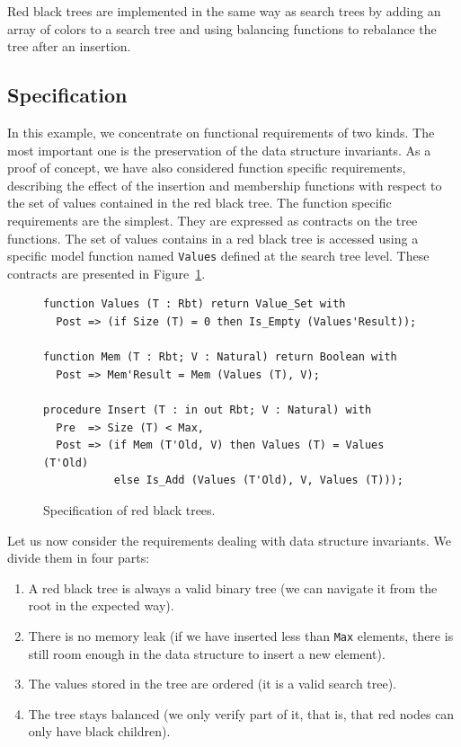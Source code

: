 \documentclass[11pt,a4paper]{article}
\begin{document}
Red black trees are implemented in the same way as search trees by adding an array of
colors to a search tree and using balancing functions to rebalance the tree after an insertion.

\subsection{Specification}

In this example, we concentrate on functional requirements of two kinds. The most important one is the
preservation of the data structure invariants. As a proof of concept, we have also considered
function specific requirements, describing the effect of the insertion and membership functions with
respect to the set of values contained in the red black tree. The function specific requirements are the
simplest. They are expressed as contracts on the tree functions. The set of values contains in a red black
tree is accessed using a specific model function named \texttt{Values} defined at the search tree level.
These contracts are presented in Figure~\ref{fig-rbt-spec}.

\begin{figure}[ht]
\begin{small}
\begin{lstlisting}
function Values (T : Rbt) return Value_Set with
  Post => (if Size (T) = 0 then Is_Empty (Values'Result));

function Mem (T : Rbt; V : Natural) return Boolean with
  Post => Mem'Result = Mem (Values (T), V);

procedure Insert (T : in out Rbt; V : Natural) with
  Pre  => Size (T) < Max,
  Post => (if Mem (T'Old, V) then Values (T) = Values (T'Old)
           else Is_Add (Values (T'Old), V, Values (T)));
\end{lstlisting}
\end{small}
\caption{\label{fig-rbt-spec} Specification of red black trees.}
\end{figure}

Let us now consider the requirements dealing with data structure invariants. We divide them in four parts:

\begin{enumerate}
 \item A red black tree is always a valid binary tree (we can navigate it from the root in the expected way).
 \item There is no memory leak (if we have inserted less than \texttt{Max} elements, there is still room
 enough in the data structure to insert a new element).
 \item The values stored in the tree are ordered (it is a valid search tree).
 \item The tree stays balanced (we only verify part of it, that is, that red nodes can only have black children).
\end{enumerate}
\end{document}
